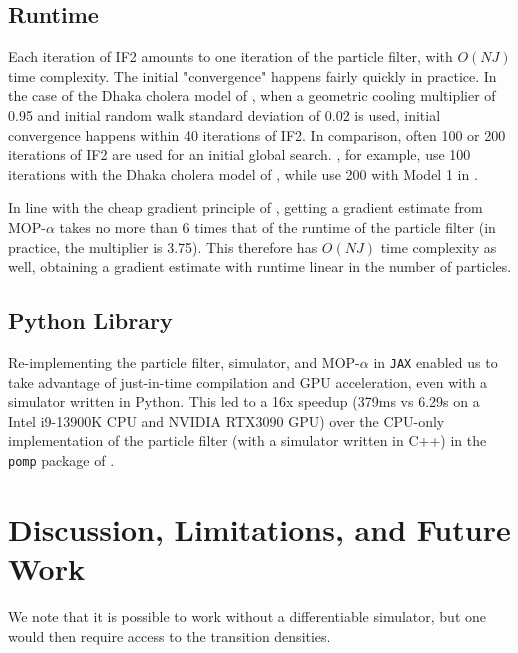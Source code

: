 \documentclass[9pt,twocolumn,twoside]{pnas-new}
\begin{document}
\subsection{Runtime}

Each iteration of IF2 amounts to one iteration of the particle filter, with $O(NJ)$ time complexity. The initial "convergence" happens fairly quickly in practice. In the case of the Dhaka cholera model of \cite{king08}, when a geometric cooling multiplier of 0.95 and initial random walk standard deviation of 0.02 is used, initial convergence happens within 40 iterations of IF2. In comparison, often 100 or 200 iterations of IF2 are used for an initial global search. \cite{ionides15}, for example, use 100 iterations with the Dhaka cholera model of \cite{king08}, while \cite{wheeler23} use 200 with Model 1 in \cite{Lee_haiticholera}. 

In line with the cheap gradient principle of \cite{kakade2019provably}, getting a gradient estimate from MOP-$\alpha$ takes no more than 6 times that of the runtime of the particle filter (in practice, the multiplier is 3.75). This therefore has $O(NJ)$ time complexity as well, obtaining a gradient estimate with runtime linear in the number of particles.

\subsection{Python Library}

Re-implementing the particle filter, simulator, and MOP-$\alpha$ in \texttt{JAX} \cite{jax} enabled us to take advantage of just-in-time compilation and GPU acceleration, even with a simulator written in Python. This led to a 16x speedup (379ms vs 6.29s on a Intel i9-13900K CPU and NVIDIA RTX3090 GPU) over the CPU-only implementation of the particle filter (with a simulator written in C++) in the \texttt{pomp} package of \cite{king16}. 





\section{Discussion, Limitations, and Future Work}

We note that it is possible to work without a differentiable simulator, but one would then require access to the transition densities. 
\end{document}
